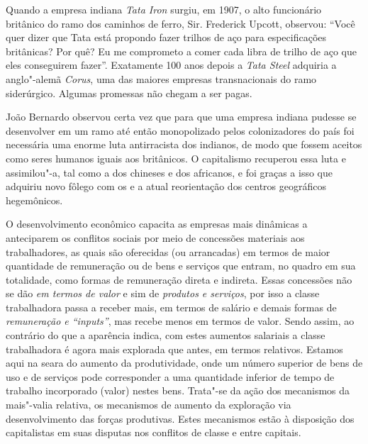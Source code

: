 Quando a empresa indiana \emph{Tata Iron} surgiu, em 1907, o alto
funcionário britânico do ramo dos caminhos de ferro, Sir. Frederick
Upcott, observou: ``Você quer dizer que Tata está propondo fazer trilhos
de aço para especificações britânicas? Por quê? Eu me comprometo a comer
cada libra de trilho de aço que eles conseguirem fazer''. Exatamente 100
anos depois a \emph{Tata Steel} adquiria a anglo"-alemã \emph{Corus}, uma
das maiores empresas transnacionais do ramo siderúrgico. Algumas
promessas não chegam a ser pagas.

João Bernardo observou certa vez que para que uma empresa indiana
pudesse se desenvolver em um ramo até então monopolizado pelos
colonizadores do país foi necessária uma enorme luta antirracista dos
indianos, de modo que fossem aceitos como seres humanos iguais aos
britânicos. O capitalismo recuperou essa luta e assimilou"-a, tal como a
dos chineses e dos africanos, e foi graças a isso que adquiriu novo
fôlego com os  e a atual reorientação dos centros geográficos
hegemônicos.

O desenvolvimento econômico capacita as empresas mais dinâmicas a
anteciparem os conflitos sociais por meio de concessões materiais aos
trabalhadores, as quais são oferecidas (ou arrancadas) em termos de
maior quantidade de remuneração ou de bens e serviços que entram, no
quadro em sua totalidade, como formas de remuneração direta e indireta.
Essas concessões não se dão \emph{em termos de valor} e sim de
\emph{produtos e serviços}, por isso a classe trabalhadora passa a
receber mais, em termos de salário e demais formas de \emph{remuneração
e ``inputs''}, mas recebe menos em termos de valor. Sendo assim, ao
contrário do que a aparência indica, com estes aumentos salariais a
classe trabalhadora é agora mais explorada que antes, em termos
relativos. Estamos aqui na seara do aumento da produtividade, onde um
número superior de bens de uso e de serviços pode corresponder a uma
quantidade inferior de tempo de trabalho incorporado (valor) nestes
bens. Trata"-se da ação dos mecanismos da mais"-valia relativa, os
mecanismos de aumento da exploração via desenvolvimento das forças
produtivas. Estes mecanismos estão à disposição dos capitalistas em suas
disputas nos conflitos de classe e entre capitais.

